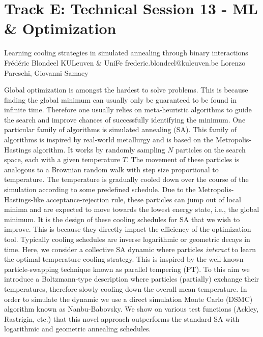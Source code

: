 \section{Track E: Technical Session 13 - ML \& Optimization}\newpage

\begin{talk}
  {Learning cooling strategies in simulated annealing through binary interactions}%
  {Fr\'ed\'eric Blondeel}%
  {KULeuven \& UniFe}%
  {frederic.blondeel@kuleuven.be}%
  {Lorenzo Pareschi, Giovanni Samaey}%
  
    
   
Global optimization is amongst the hardest to solve problems. This is because finding the global minimum can usually only be guaranteed to be found in infinite time. Therefore one usually relies on meta-heuristic algorithms to guide the search and improve chances of successfully identifying the minimum. One particular family of algorithms is simulated annealing (SA). This family of algorithms is inspired by real-world metallurgy and is based on the Metropolis-Hastings algorithm. It works by randomly sampling $N$ particles on the search space, each with a given temperature $T$. The movement of these particles is analogous to a Brownian random walk with step size proportional to temperature. The temperature is gradually cooled down over the course of the simulation according to some predefined schedule. Due to the Metropolis-Hastings-like acceptance-rejection rule, these particles can jump out of local minima and are expected to move towards the lowest energy state, i.e., the global minimum. It is the design of these cooling schedules for SA that we wish to improve. This is because they directly impact the efficiency of the optimization tool. Typically cooling schedules are inverse logarithmic or geometric decays in time. Here, we consider a collective SA dynamic where particles \textit{interact} to learn the optimal temperature cooling strategy. This is inspired by the well-known particle-swapping technique known as parallel tempering (PT). To this aim we introduce a Boltzmann-type description where particles (partially) exchange their temperatures, therefore slowly cooling down the overall mean temperature. In order to simulate the dynamic we use a direct simulation Monte Carlo (DSMC) algorithm known as Nanbu-Babovsky. We show on various test functions (Ackley, Rastrigin, etc.) that this novel approach outperforms the standard SA with logarithmic and geometric annealing schedules.

\end{talk}

